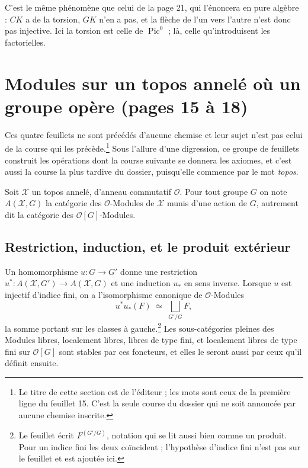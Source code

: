 \documentclass[11pt,a4paper]{article}
\begin{document}
C'est le même phénomène que celui de la page 21, qui l'énoncera en pure algèbre :
$CK$ a de la torsion, $GK$ n'en a pas, et la flèche de l'un vers l'autre n'est
donc pas injective. Ici la torsion est celle de $\operatorname{Pic}^{0}$ ; là,
celle qu'introduisent les factorielles.

\section*{Modules sur un topos annelé où un groupe opère (pages 15 à 18)}

Ces quatre feuillets ne sont précédés d'aucune chemise et leur sujet n'est pas
celui de la course qui les précède.\footnote{Le titre de cette section est de
l'éditeur ; les mots sont ceux de la première ligne du feuillet 15. C'est la
seule course du dossier qui ne soit annoncée par aucune chemise inscrite.}
Sous l'allure d'une digression, ce groupe de feuillets construit les opérations dont la course suivante se donnera les axiomes, et c'est aussi la
course la plus tardive du dossier, puisqu'elle commence par le mot
\emph{topos}.

Soit $\mathcal{X}$ un topos annelé, d'anneau commutatif $\mathcal{O}$. Pour
tout groupe $G$ on note $A(\mathcal{X}, G)$ la catégorie des $\mathcal{O}$-Modules
de $\mathcal{X}$ munis d'une action de $G$, autrement dit la catégorie des
$\mathcal{O}[G]$-Modules.

\subsection*{Restriction, induction, et le produit extérieur}

Un homomorphisme $u : G \to G'$ donne une restriction
$u^{*} : A(\mathcal{X}, G') \to A(\mathcal{X}, G)$ et une induction
$u_{*}$ en sens inverse. Lorsque $u$ est injectif d'indice fini, on a
l'isomorphisme canonique de $\mathcal{O}$-Modules
\[
  u^{*} u_{*}(F) \;\simeq\; \bigsqcup_{G'/G} F ,
\]
la somme portant sur les classes à gauche.\footnote{Le feuillet écrit $F^{(G'/G)}$, notation qui se lit aussi
bien comme un produit. Pour un indice fini les deux coïncident ; l'hypothèse
d'indice fini n'est pas sur le feuillet et est ajoutée ici.} Les
sous-catégories pleines des Modules libres, localement libres, libres de type
fini, et localement libres de type fini sur $\mathcal{O}[G]$ sont stables par
ces foncteurs, et elles le seront aussi par ceux qu'il définit ensuite.
\end{document}
